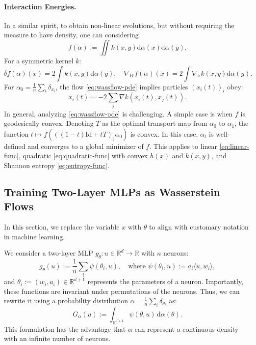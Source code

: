 \paragraph{Interaction Energies.} In a similar spirit, to obtain non-linear evolutions, but without requiring the measure to have density, one can considering
   \begin{equation}
       f(\alpha) := \iint k(x, y) \mathrm{d} \alpha(x) \mathrm{d} \alpha(y). \label{eq:quadratic-func}
   \end{equation}
   For a symmetric kernel $k$:
   \begin{equation}
       \delta f(\alpha)(x) = 2 \int k(x, y) \mathrm{d} \alpha(y), \quad \nabla_W f(\alpha)(x) = 2 \int \nabla_x k(x, y) \mathrm{d} \alpha(y).
   \end{equation}
   For $\alpha_0 = \frac{1}{n} \sum_i \delta_{x_i}$, the flow \eqref{eq:wassflow-pde} implies particles $(x_i(t))_i$ obey:
   \begin{equation}
       \dot{x}_i(t) = -2 \sum_j \nabla k(x_i(t), x_j(t)).
   \end{equation}
In general, analyzing \eqref{eq:wassflow-pde} is challenging. A simple case is when $f$ is geodesically convex. Denoting $T$ as the optimal transport map from $\alpha_0$ to $\alpha_1$, the function $t \mapsto f(((1-t)\mathrm{Id} + tT)_\sharp \alpha_0)$ is convex. In this case, $\alpha_t$ is well-defined and converges to a global minimizer of $f$. This applies to linear \eqref{eq:linear-func}, quadratic \eqref{eq:quadratic-func} with convex $h(x)$ and $k(x, y)$, and Shannon entropy \eqref{eq:entropy-func}.

\subsection{Training Two-Layer MLPs as Wasserstein Flows}

In this section, we replace the variable $x$ with $\theta$ to align with customary notation in machine learning. 

We consider a two-layer MLP $g_\theta : u \in \mathbb{R}^d \to \mathbb{R}$ with $n$ neurons:
\begin{equation}
    g_\theta(u) := \frac{1}{n} \sum_i \psi(\theta_i, u), \quad \text{where } \psi(\theta_i, u) := a_i \langle u, w_i \rangle,
\end{equation}
and $\theta_i := (w_i, a_i) \in \mathbb{R}^{d+1}$ represents the parameters of a neuron. Importantly, these functions are invariant under permutations of the neurons. Thus, we can rewrite it using a probability distribution $\alpha = \frac{1}{n} \sum_i \delta_{\theta_i}$ as:
\begin{equation}
    G_\alpha(u) := \int_{\mathbb{R}^{d+1}} \psi(\theta, u) \, \mathrm{d} \alpha(\theta).
\end{equation}
This formulation has the advantage that $\alpha$ can represent a continuous density with an infinite number of neurons.

